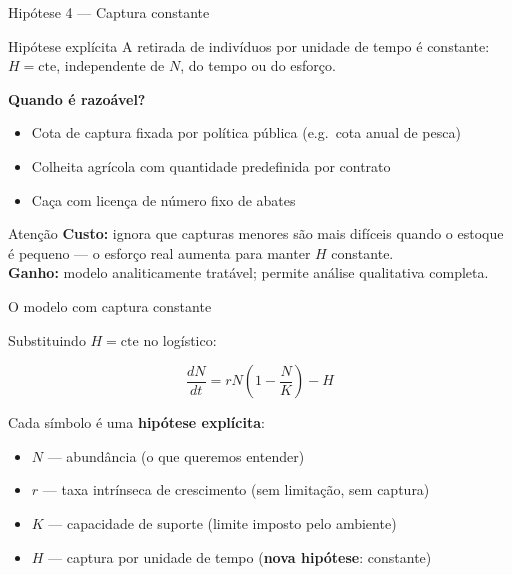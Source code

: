 \documentclass[12pt]{beamer}
\begin{document}
\begin{frame}{Hipótese 4 --- Captura constante}

  \begin{exampleblock}{Hipótese explícita}
    A retirada de indivíduos por unidade de tempo é constante:
    $H = \text{cte}$, independente de $N$, do tempo ou do esforço.
  \end{exampleblock}

  \bigskip
  \textbf{Quando é razoável?}
  \begin{itemize}
    \item Cota de captura fixada por política pública (e.g.\ cota anual de pesca)
    \item Colheita agrícola com quantidade predefinida por contrato
    \item Caça com licença de número fixo de abates
  \end{itemize}

  \bigskip
  \begin{block}{Atenção}
    \textbf{Custo:} ignora que capturas menores são mais difíceis quando o
    estoque é pequeno --- o esforço real aumenta para manter $H$ constante.\\
    \textbf{Ganho:} modelo analiticamente tratável; permite análise qualitativa completa.
  \end{block}

\end{frame}

\begin{frame}{O modelo com captura constante}

  Substituindo $H = \text{cte}$ no logístico:

  \[
    \boxed{\frac{dN}{dt} = rN\!\left(1 - \frac{N}{K}\right) - H}
  \]

  \bigskip
  Cada símbolo é uma \textbf{hipótese explícita}:

  \bigskip
  \begin{itemize}
    \item $N$ --- abundância (o que queremos entender)
    \item $r$ --- taxa intrínseca de crescimento (sem limitação, sem captura)
    \item $K$ --- capacidade de suporte (limite imposto pelo ambiente)
    \item $H$ --- captura por unidade de tempo (\textbf{nova hipótese}: constante)
  \end{itemize}

\end{frame}
\end{document}
